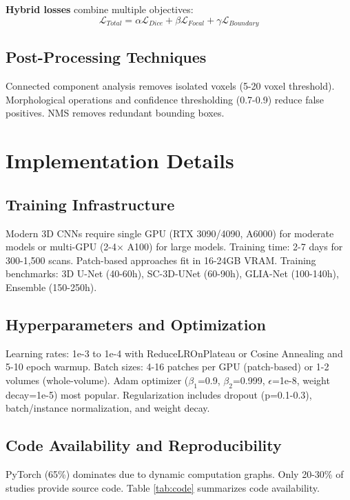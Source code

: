 \documentclass[conference]{IEEEtran}
\begin{document}
\textbf{Hybrid losses} combine multiple objectives:
\begin{equation}
\mathcal{L}_{Total} = \alpha \mathcal{L}_{Dice} + \beta \mathcal{L}_{Focal} + \gamma \mathcal{L}_{Boundary}
\end{equation}

\subsection{Post-Processing Techniques}

Connected component analysis removes isolated voxels (5-20 voxel threshold). Morphological operations and confidence thresholding (0.7-0.9) reduce false positives. NMS removes redundant bounding boxes.

\section{Implementation Details}

\subsection{Training Infrastructure}

Modern 3D CNNs require single GPU (RTX 3090/4090, A6000) for moderate models or multi-GPU (2-4$\times$ A100) for large models. Training time: 2-7 days for 300-1,500 scans. Patch-based approaches fit in 16-24GB VRAM. Training benchmarks: 3D U-Net (40-60h), SC-3D-UNet (60-90h), GLIA-Net (100-140h), Ensemble (150-250h).

\subsection{Hyperparameters and Optimization}

Learning rates: 1e-3 to 1e-4 with ReduceLROnPlateau or Cosine Annealing and 5-10 epoch warmup. Batch sizes: 4-16 patches per GPU (patch-based) or 1-2 volumes (whole-volume). Adam optimizer ($\beta_1$=0.9, $\beta_2$=0.999, $\epsilon$=1e-8, weight decay=1e-5) most popular. Regularization includes dropout (p=0.1-0.3), batch/instance normalization, and weight decay.

\subsection{Code Availability and Reproducibility}

PyTorch (65\%) dominates due to dynamic computation graphs. Only 20-30\% of studies provide source code. Table \ref{tab:code} summarizes code availability.
\end{document}
